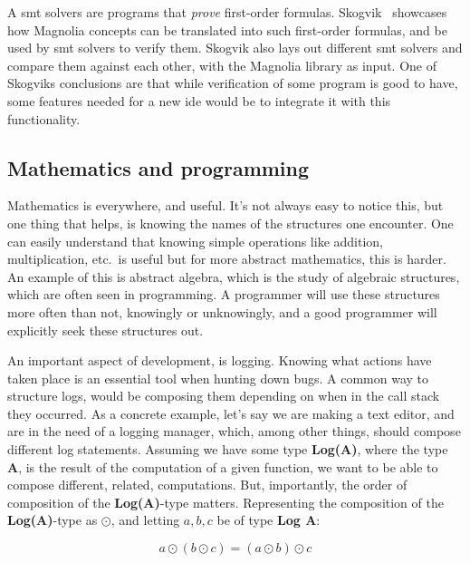 A \gls*{smt} solvers are programs that \textit{prove} first-order formulas.
Skogvik~\cite{beateVerification} showcases how Magnolia concepts can be
translated into such first-order formulas, and be used by \gls*{smt} solvers to
verify them. Skogvik also lays out different \gls*{smt} solvers and compare them
against each other, with the Magnolia library as input. One of Skogviks
conclusions are that while verification of some program is good to have, some
features needed for a new \gls*{ide} would be to integrate it with this
functionality.


\subsection{Mathematics and programming}

Mathematics is everywhere, and useful. It's not always easy to notice this, but
one thing that helps, is knowing the names of the structures one encounter. One
can easily understand that knowing simple operations like addition,
multiplication, etc.\ is useful but for more abstract mathematics, this is
harder. An example of this is abstract algebra, which is the study of algebraic
structures, which are often seen in programming. A programmer will use these
structures more often than not, knowingly or unknowingly, and a good programmer
will explicitly seek these structures out.

An important aspect of development, is logging. Knowing what actions have taken
place is an essential tool when hunting down bugs. A common way to structure
logs, would be composing them depending on when in the call stack they occurred.
As a concrete example, let's say we are making a text editor, and are in the
need of a logging manager, which, among other things, should compose different
log statements. Assuming we have some type \textbf{Log(A)}, where the type
\textbf{A}, is the result of the computation of a given function, we want to be
able to compose different, related, computations. But, importantly, the order of
composition of the \textbf{Log(A)}-type matters. Representing the composition of
the \textbf{Log(A)}-type as $\odot$, and letting $a, b, c$ be of type
\textbf{Log A}:

\begin{definition} \label{def:logComp}
  \begin{equation}
    a \odot \left ( b \odot c \right ) = \left ( a \odot b \right ) \odot c
  \end{equation}
\end{definition}

